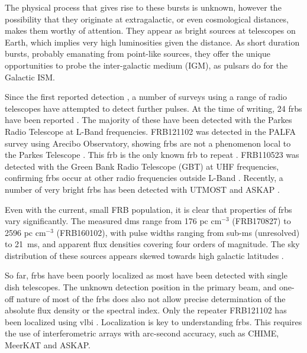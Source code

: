\documentclass[a4paper,fleqn,usenatbib]{mnras}
\begin{document}
The physical process that gives rise to these bursts is unknown,
however the possibility that they originate at extragalactic, or even
cosmological distances, makes them worthy of attention. They appear as
bright sources at telescopes on Earth, which implies very high
luminosities given the distance. As short duration bursts, probably
emanating from point-like sources, they offer the unique opportunities
to probe the inter-galactic medium (IGM), as pulsars do for the Galactic
ISM.

Since the first reported detection \citep{2007Sci...318..777L}, a
number of surveys using a range of radio telescopes have attempted to
detect further pulses. At the time of writing, 24 \glspl{frb} have
been reported \citep[for an up-to-date list,
  see][]{2016PASA...33...45P}. The majority of these have been
detected with the Parkes Radio Telescope at L-Band
frequencies. FRB121102 was detected in the PALFA survey using Arecibo
Observatory, showing \glspl{frb} are not a phenomenon local to the
Parkes Telescope \citep{2014ApJ...790..101S}. This \gls{frb} is the
only known \gls{frb} to repeat \citep{2016ApJ...833..177S}. FRB110523
was detected with the Green Bank Radio Telescope (GBT) at UHF
frequencies, confirming \glspl{frb} occur at other radio frequencies
outside L-Band \citep{2015Natur.528..523M}.  Recently, a number of
very bright \glspl{frb} has been detected with UTMOST
\citep{2017MNRAS.468.3746C,atel10697} and ASKAP
\citep{2017ApJ...841L..12B}.

Even with the current, small FRB population, it is clear that
properties of \glspl{frb} vary significantly. The measured \glspl{dm}
range from 176 pc cm$^{-3}$ (FRB170827) to 2596 pc cm$^{-3}$
(FRB160102), with pulse widths ranging from sub-ms (unresolved) to
21~ms, and apparent flux densities covering four orders of
magnitude. The sky distribution of these sources appears skewed
towards high galactic latitudes \citep{2015MNRAS.451.3278M}.

So far, \glspl{frb} have been poorly localized as most have been
detected with single dish telescopes. The unknown detection position
in the primary beam, and one-off nature of most of the \glspl{frb}
does also not allow precise determination of the absolute flux density
or the spectral index. Only the repeater FRB121102 has been localized
using \gls{vlbi} \citep{2017ApJ...834L...8M,
  2017ApJ...834L...7T}. Localization is key to understanding
\glspl{frb}. This requires the use of interferometric arrays with
arc-second accuracy, such as CHIME, MeerKAT and ASKAP. 
\end{document}
